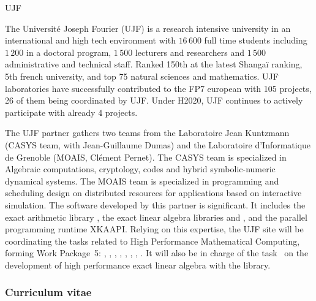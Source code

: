 \begin{sitedescription}{UJF}



The Université Joseph Fourier (UJF)  is a research intensive university in an
international and high tech environment with $16\,600$ full time students
including $1\,200$ in a doctoral program, $1\,500$ lecturers and researchers and
$1\,500$ administrative and technical staff. Ranked 150th at the latest Shanga\"i
ranking, 5th french university, and top 75 natural sciences and mathematics.
UJF laboratories have successfully contributed to the FP7 european with 
105 projects, 26 of them being coordinated by UJF. Under H2020, UJF continues to
actively participate with already 4 projects.

The UJF partner gathers two teams from the Laboratoire Jean Kuntzmann
(CASYS team, with Jean-Guillaume Dumas) and the Laboratoire d’Informatique de
Grenoble (MOAIS, Clément Pernet). The 
CASYS team is specialized in Algebraic computations, cryptology, codes and hybrid symbolic-numeric dynamical systems. The MOAIS team is specialized in programming and scheduling
design on distributed resources for applications based on interactive simulation. The software
developed by this partner is significant. It includes the exact arithmetic
library \Givaro, the exact linear algebra libraries \fflas and \Linbox, and the
parallel programming runtime XKAAPI.
Relying on this expertise, the UJF site will be coordinating the tasks related
to High Performance Mathematical Computing, forming Work Package~5:
, 
, 
, 
,
, 
,
,
.
It will also be in charge of the task~ on the
development of high performance exact linear algebra with the \Linbox library.
\subsubsection*{Curriculum vitae}





%


\end{sitedescription}
